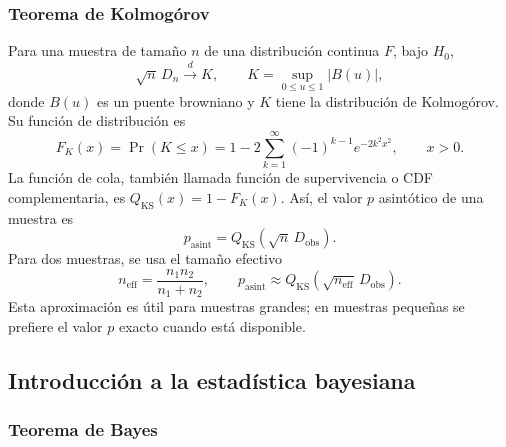 \subsubsection{Teorema de Kolmogórov}

Para una muestra de tamaño $n$ de una distribución continua $F$, bajo $H_0$,
\[
  \sqrt n\,D_n \xrightarrow{d} K,
  \qquad
  K=\sup_{0\le u\le 1}|B(u)|,
\]
donde $B(u)$ es un puente browniano y $K$ tiene la distribución de Kolmogórov. Su función de distribución es
\[
  F_K(x)=\Pr(K\le x)
  =1-2\sum_{k=1}^{\infty}(-1)^{k-1}e^{-2k^2x^2},
  \qquad x>0.
\]
La función de cola, también llamada función de supervivencia o CDF complementaria, es $Q_{\mathrm{KS}}(x)=1-F_K(x)$. Así, el valor $p$ asintótico de una muestra es
\[
  p_{\mathrm{asint}}=Q_{\mathrm{KS}}(\sqrt n\,D_{\mathrm{obs}}).
\]
Para dos muestras, se usa el tamaño efectivo
\[
  n_{\mathrm{eff}}=\frac{n_1n_2}{n_1+n_2},
  \qquad
  p_{\mathrm{asint}}\approx Q_{\mathrm{KS}}
  (\sqrt{n_{\mathrm{eff}}}\,D_{\mathrm{obs}}).
\]
Esta aproximación es útil para muestras grandes; en muestras pequeñas se prefiere el valor $p$ exacto cuando está disponible.

\begin{center}
\end{center}

\subsection{Introducción a la estadística bayesiana}

\subsubsection{Teorema de Bayes}

